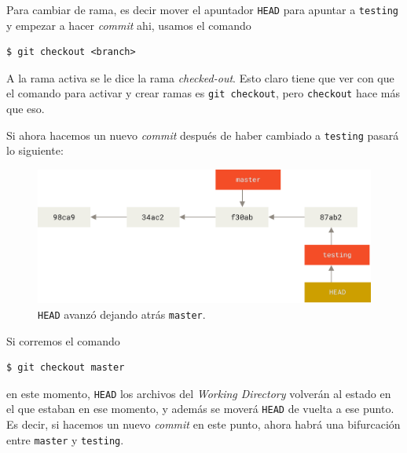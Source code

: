 \documentclass[spanish, 12pt, a4paper]{article}
\begin{document}
Para cambiar de rama, es decir mover el apuntador
\passthrough{\lstinline!HEAD!} para apuntar a
\passthrough{\lstinline!testing!} y empezar a hacer \emph{commit} ahi,
usamos el comando

\begin{lstlisting}
$ git checkout <branch>
\end{lstlisting}

A la rama activa se le dice la rama \emph{checked-out}. Esto claro tiene
que ver con que el comando para activar y crear ramas es
\passthrough{\lstinline!git checkout!}, pero
\passthrough{\lstinline!checkout!} hace más que eso.

Si ahora hacemos un nuevo \emph{commit} después de haber cambiado a
\passthrough{\lstinline!testing!} pasará lo siguiente:

\begin{figure}
\centering
\includegraphics{figs/advance-testing.png}
\caption{\passthrough{\lstinline!HEAD!} avanzó dejando atrás
\passthrough{\lstinline!master!}.}
\end{figure}

Si corremos el comando

\begin{lstlisting}
$ git checkout master
\end{lstlisting}

en este momento, \passthrough{\lstinline!HEAD!} los archivos del
\emph{Working Directory} volverán al estado en el que estaban en ese
momento, y además se moverá \passthrough{\lstinline!HEAD!} de vuelta a
ese punto. Es decir, si hacemos un nuevo \emph{commit} en este punto,
ahora habrá una bifurcación entre \passthrough{\lstinline!master!} y
\passthrough{\lstinline!testing!}.
\end{document}
